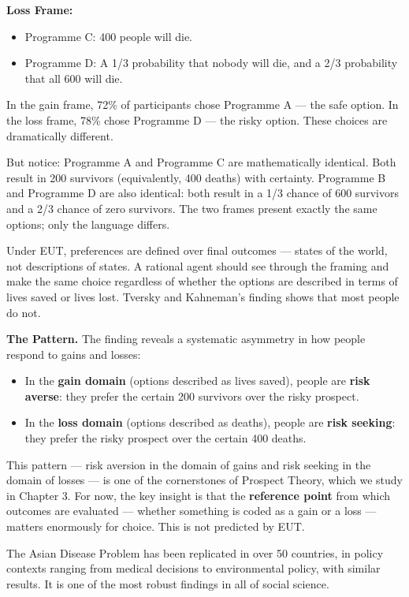 \documentclass[12pt, letterpaper]{article}
\begin{document}
\textbf{Loss Frame:}
\begin{itemize}
\item Programme C: 400 people will die.
\item Programme D: A 1/3 probability that nobody will die, and a 2/3 probability that all 600 will die.
\end{itemize}

In the gain frame, 72\% of participants chose Programme A --- the safe option. In the loss frame, 78\% chose Programme D --- the risky option. These choices are dramatically different.

But notice: Programme A and Programme C are mathematically identical. Both result in 200 survivors (equivalently, 400 deaths) with certainty. Programme B and Programme D are also identical: both result in a 1/3 chance of 600 survivors and a 2/3 chance of zero survivors. The two frames present exactly the same options; only the language differs.

Under EUT, preferences are defined over final outcomes --- states of the world, not descriptions of states. A rational agent should see through the framing and make the same choice regardless of whether the options are described in terms of lives saved or lives lost. Tversky and Kahneman's finding shows that most people do not.

\textbf{The Pattern.} The finding reveals a systematic asymmetry in how people respond to gains and losses:
\begin{itemize}
\item In the \textbf{gain domain} (options described as lives saved), people are \textbf{risk averse}: they prefer the certain 200 survivors over the risky prospect.
\item In the \textbf{loss domain} (options described as deaths), people are \textbf{risk seeking}: they prefer the risky prospect over the certain 400 deaths.
\end{itemize}

This pattern --- risk aversion in the domain of gains and risk seeking in the domain of losses --- is one of the cornerstones of Prospect Theory, which we study in Chapter 3. For now, the key insight is that the \textbf{reference point} from which outcomes are evaluated --- whether something is coded as a gain or a loss --- matters enormously for choice. This is not predicted by EUT.

The Asian Disease Problem has been replicated in over 50 countries, in policy contexts ranging from medical decisions to environmental policy, with similar results. It is one of the most robust findings in all of social science.
\end{document}

